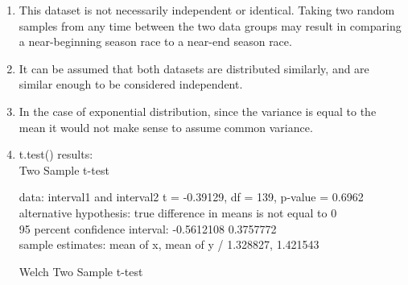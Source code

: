 \documentclass{article}
\begin{document}
\begin{enumerate}
\begin{multicols}{2}
\begin{tabular}{lr|}
                  interval2    & 1.421543
              \end{tabular}
              \\ \\
              Going by the given means, we can see that each interval is approximately the inverse of the \# of safety car deployments per half (i.e: interval \(\approx \frac{1}{\# of deployments}\)). This makes sense as the exponential distribution (time between deployments) is the distribution of the time between events, and the Poisson distribution (number of deployments within a timespan), are inversely related.
          \end{multicols}
    \item This dataset is not necessarily independent or identical. Taking two random samples from any time between the two data groups may result in comparing a near-beginning season race to a near-end season race.
    \item It can be assumed that both datasets are distributed similarly, and are similar enough to be considered independent.
    \item In the case of exponential distribution, since the variance is equal to the mean it would not make sense to assume common variance.
    \item t.test() results:\\
          Two Sample t-test

          data:  interval1 and interval2
          t = -0.39129, df = 139, p-value = 0.6962 \\
          alternative hypothesis: true difference in means is not equal to 0 \\
          95 percent confidence interval:
          -0.5612108  0.3757772 \\
          sample estimates:
          mean of x, mean of y /
          1.328827, 1.421543


          Welch Two Sample t-test


\end{enumerate}
\end{document}
